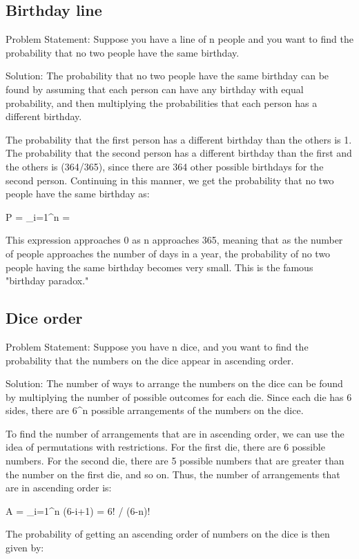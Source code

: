 \documentclass[12pt, a4paper, oneside]{article}
\begin{document}
\subsection{ Birthday line }
Problem Statement:
Suppose you have a line of n people and you want to find the probability that no two people have the same birthday.

Solution:
The probability that no two people have the same birthday can be found by assuming that each person can have any birthday with equal probability, and then multiplying the probabilities that each person has a different birthday.

The probability that the first person has a different birthday than the others is 1. The probability that the second person has a different birthday than the first and the others is (364/365), since there are 364 other possible birthdays for the second person. Continuing in this manner, we get the probability that no two people have the same birthday as:

P = \prod_{i=1}^{n}  = 

This expression approaches 0 as n approaches 365, meaning that as the number of people approaches the number of days in a year, the probability of no two people having the same birthday becomes very small. This is the famous "birthday paradox."
\subsection{ Dice order }
Problem Statement:
Suppose you have n dice, and you want to find the probability that the numbers on the dice appear in ascending order.

Solution:
The number of ways to arrange the numbers on the dice can be found by multiplying the number of possible outcomes for each die. Since each die has 6 sides, there are 6^n possible arrangements of the numbers on the dice.

To find the number of arrangements that are in ascending order, we can use the idea of permutations with restrictions. For the first die, there are 6 possible numbers. For the second die, there are 5 possible numbers that are greater than the number on the first die, and so on. Thus, the number of arrangements that are in ascending order is:

A = \prod_{i=1}^{n} (6-i+1) = 6! / (6-n)!

The probability of getting an ascending order of numbers on the dice is then given by:
\end{document}
